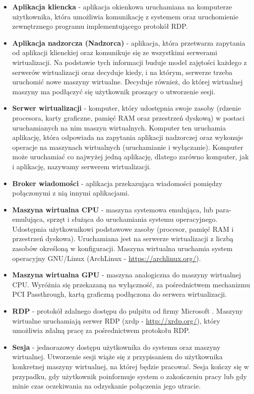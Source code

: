 \documentclass[../wstep.tex]{subfiles}
\begin{document}
\begin{itemize}
  \item \textbf{Aplikacja kliencka} - aplikacja okienkowa uruchamiana na komputerze użytkownika, która umożliwia komunikację z systemem oraz uruchomienie zewnętrznego programu implementującego protokół RDP.
  \item \textbf{Aplikacja nadzorcza (Nadzorca)} - aplikacja, która przetwarza zapytania od aplikacji klienckiej oraz komunikuje się ze wszystkimi serwerami wirtualizacji. Na podstawie tych informacji buduje model zajętości każdego z serwerów wirtualizacji oraz decyduje kiedy, i na którym, serwerze trzeba uruchomić nowe maszyny wirtualne. Decyduje również, do której wirtualnej maszyny ma podłączyć się użytkownik proszący o utworzenie sesji.
  \item \textbf{Serwer wirtualizacji} - komputer, który udostępnia swoje zasoby (rdzenie procesora, karty graficzne, pamięć RAM oraz przestrzeń dyskową) w postaci uruchamianych na nim maszyn wirtualnych. Komputer ten uruchamia aplikację, która odpowiada na zapytania aplikacji nadzorczej oraz wykonuje operacje na maszynach wirtualnych (uruchamianie i wyłączanie). Komputer może uruchamiać co najwyżej jedną aplikację, dlatego zarówno komputer, jak i aplikację, nazywamy serwerem wirtualizacji.
  \item \textbf{Broker wiadomości} - aplikacja przekazująca wiadomości pomiędzy połączonymi z nią innymi aplikacjami.
  \item \textbf{Maszyna wirtualna CPU} - maszyna systemowa emulująca, lub para-emulująca, sprzęt i służąca do uruchamiania systemu operacyjnego. Udostępnia użytkownikowi podstawowe zasoby (procesor, pamięć RAM i przestrzeń dyskowa). Uruchamiana jest na serwerze wirtualizacji z liczbą zasobów określoną w konfiguracji. Maszyna wirtualna uruchamia system operacyjny GNU/Linux (ArchLinux - \url{https://archlinux.org/}).
  \item \textbf{Maszyna wirtualna GPU} - maszyna analogiczna do maszyny wirtualnej CPU. Wyróżnia się przekazaną na wyłączność, za pośrednictwem mechanizmu PCI Passthrough, kartą graficzną podłączona do serwera wirtualizacji.
  \item \textbf{RDP} - protokół zdalnego dostępu do pulpitu od firmy Microsoft \parencite{rdp}. Maszyny wirtualne uruchamiają serwer RDP (xrdp - \url{http://xrdp.org/}), który umożliwia zdalną pracę za pośrednictwem protokołu RDP.
  \item \textbf{Sesja} - jednorazowy dostępu użytkownika do systemu oraz maszyny wirtualnej. Utworzenie sesji wiąże się z przypisaniem do użytkownika konkretnej maszyny wirtualnej, na której będzie pracować. Sesja kończy się w przypadku, gdy użytkownik poinformuje system o zakończeniu pracy lub gdy minie czas oczekiwania na odzyskanie połączenia jego utracie.

\end{itemize}
\end{document}
